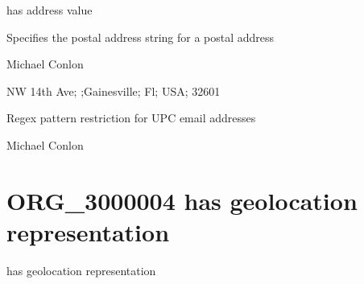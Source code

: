 \documentclass[letterpaper,10pt,english]{sphinxmanual}
\begin{document}
\begin{sphinxShadowBox}

\sphinxAtStartPar
has address value
\end{sphinxShadowBox}

\begin{sphinxShadowBox}

\sphinxAtStartPar
Specifies the postal address string for a postal address
\end{sphinxShadowBox}

\begin{sphinxShadowBox}

\sphinxAtStartPar
Michael Conlon 
\end{sphinxShadowBox}

\begin{sphinxShadowBox}

 NW 14th Ave; ;Gainesville; Fl; USA; 32601
\end{sphinxShadowBox}

\begin{sphinxShadowBox}

\sphinxAtStartPar
Regex pattern restriction for UPC email addresses
\end{sphinxShadowBox}

\begin{sphinxShadowBox}

\sphinxAtStartPar
Michael Conlon 
\end{sphinxShadowBox}
\begin{quote}

\ignorespaces \end{quote}


\section{ORG\_3000004 \sphinxhyphen{} has geolocation representation}
\label{\detokenize{doc-ORG_3000004:org-3000004-has-geolocation-representation}}\label{\detokenize{doc-ORG_3000004:index-0}}\label{\detokenize{doc-ORG_3000004::doc}}
\begin{sphinxShadowBox}

\sphinxAtStartPar
has geolocation representation
\end{sphinxShadowBox}
\end{document}

